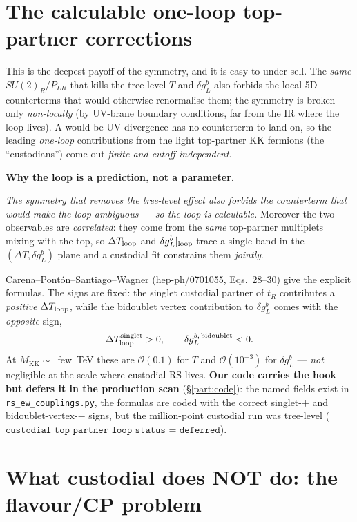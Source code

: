\documentclass[11pt]{article}
\newenvironment{callout}[1]{%
  \par\medskip\begin{shaded}\noindent\textbf{#1}\par\smallskip}{\end{shaded}\medskip}
\newcommand{\MKK}{M_{\mathrm{KK}}}
\newcommand{\SUR}{SU(2)_R}
\newcommand{\PLR}{P_{LR}}
\newcommand{\code}[1]{\texttt{#1}}
\newcommand{\dgL}{\delta g_L^b}
\theoremstyle{definition}
\begin{document}
\section{The calculable one-loop top-partner corrections}
\label{sec:loop}

This is the deepest payoff of the symmetry, and it is easy to under-sell. The
\emph{same} $\SUR/\PLR$ that kills the tree-level $T$ and $\dgL$ also forbids the
local 5D counterterms that would otherwise renormalise them; the symmetry is
broken only \emph{non-locally} (by UV-brane boundary conditions, far from the IR
where the loop lives). A would-be UV divergence has no counterterm to land on,
so the leading \emph{one-loop} contributions from the light top-partner KK
fermions (the ``custodians'') come out \emph{finite and cutoff-independent}.

\begin{callout}{Why the loop is a prediction, not a parameter.}
\emph{The symmetry that removes the tree-level effect also forbids the
counterterm that would make the loop ambiguous --- so the loop is calculable.}
Moreover the two observables are \emph{correlated}: they come from the \emph{same}
top-partner multiplets mixing with the top, so $\Delta T_{\rm loop}$ and
$\dgL|_{\rm loop}$ trace a single band in the $(\Delta T,\dgL)$ plane and a
custodial fit constrains them \emph{jointly}.
\end{callout}

\noindent Carena--Pont\'on--Santiago--Wagner (hep-ph/0701055, Eqs.~28--30) give
the explicit formulas. The signs are fixed: the singlet custodial partner of
$t_R$ contributes a \emph{positive} $\Delta T_{\rm loop}$, while the bidoublet
vertex contribution to $\dgL$ comes with the \emph{opposite} sign,
\begin{equation}
\Delta T^{\rm singlet}_{\rm loop} > 0, \qquad \delta g_L^{b,\,\rm bidoublet} < 0 .
\label{eq:loopsigns}
\end{equation}
At $\MKK\sim$~few~TeV these are $\mathcal{O}(0.1)$ for $T$ and
$\mathcal{O}(10^{-3})$ for $\dgL$ --- \emph{not} negligible at the scale where
custodial RS lives. \textbf{Our code carries the hook but defers it in the
production scan} (\S\ref{part:code}): the named fields exist in
\code{rs\_ew\_couplings.py}, the formulas are coded with the correct singlet-$+$
and bidoublet-vertex-$-$ signs, but the million-point custodial run was tree-level
($\code{custodial\_top\_partner\_loop\_status = deferred}$).

\section{What custodial does NOT do: the flavour/CP problem}
\label{sec:flavour}
\end{document}
